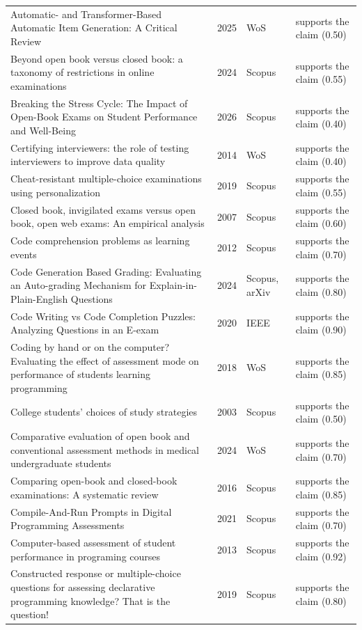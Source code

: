 \begin{longtable}{@{}%
  >{\raggedright\arraybackslash}p{}c%
  >{\raggedright\arraybackslash}p{}%
  >{\raggedright\arraybackslash}p{}@{}}
Automatic- and Transformer-Based Automatic Item Generation: A Critical Review & 2025 & WoS & supports the claim (0.50) \\
Beyond open book versus closed book: a taxonomy of restrictions in online examinations & 2024 & Scopus & supports the claim (0.55) \\
Breaking the Stress Cycle: The Impact of Open-Book Exams on Student Performance and Well-Being & 2026 & Scopus & supports the claim (0.40) \\
Certifying interviewers: the role of testing interviewers to improve data quality & 2014 & WoS & supports the claim (0.40) \\
Cheat-resistant multiple-choice examinations using personalization & 2019 & Scopus & supports the claim (0.55) \\
Closed book, invigilated exams versus open book, open web exams: An empirical analysis & 2007 & Scopus & supports the claim (0.60) \\
Code comprehension problems as learning events & 2012 & Scopus & supports the claim (0.70) \\
Code Generation Based Grading: Evaluating an Auto-grading Mechanism for \textquotedbl{}Explain-in-Plain-English\textquotedbl{} Questions & 2024 & Scopus, arXiv & supports the claim (0.80) \\
Code Writing vs Code Completion Puzzles: Analyzing Questions in an E-exam & 2020 & IEEE & supports the claim (0.90) \\
Coding by hand or on the computer? Evaluating the effect of assessment mode on performance of students learning programming & 2018 & WoS & supports the claim (0.85) \\
College students' choices of study strategies & 2003 & Scopus & supports the claim (0.50) \\
Comparative evaluation of open book and conventional assessment methods in medical undergraduate students & 2024 & WoS & supports the claim (0.70) \\
Comparing open-book and closed-book examinations: A systematic review & 2016 & Scopus & supports the claim (0.85) \\
Compile-And-Run Prompts in Digital Programming Assessments & 2021 & Scopus & supports the claim (0.70) \\
Computer-based assessment of student performance in programing courses & 2013 & Scopus & supports the claim (0.92) \\
Constructed response or multiple-choice questions for assessing declarative programming knowledge? That is the question! & 2019 & Scopus & supports the claim (0.80) \\

\end{longtable}
